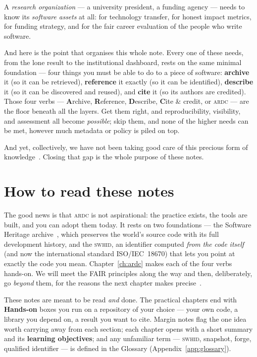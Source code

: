 A \emph{research organization} --- a university president, a funding agency --- needs to know its
\emph{software assets} at all: for technology transfer, for honest impact metrics, for funding
strategy, and for the fair career evaluation of the people who write software.

And here is the point that organises this whole note. Every one of these needs, from the lone result
to the institutional dashboard, rests on the same minimal foundation --- four things you must be
able to do to a piece of software: \textbf{archive} it (so it can be retrieved), \textbf{reference}
it exactly (so it can be identified), \textbf{describe} it (so it can be discovered and reused), and
\textbf{cite} it (so its authors are credited). Those four verbs --- \textbf{A}rchive,
\textbf{R}eference, \textbf{D}escribe, \textbf{C}ite \& credit, or \textsc{ardc} --- are the floor
beneath all the layers. Get them right, and reproducibility, visibility, and assessment all become
\emph{possible}; skip them, and none of the higher needs can be met, however much metadata or policy
is piled on top.


And yet, collectively, we have not been taking good care of this precious form of
knowledge~\autocite{SwhCACM2018}. Closing that gap is the whole purpose of these notes.

\section{How to read these notes}

The good news is that \textsc{ardc} is not aspirational: the practice exists, the tools are built,
and you can adopt them today. It rests on two foundations --- the Software Heritage archive~\autocite{softwareheritage}, which
preserves the world's source code with its full development history, and the \textsc{swhid}, an
identifier computed \emph{from the code itself} (and now the international standard ISO/IEC~18670)
that lets you point at exactly the code you mean. Chapter~\ref{ch:ardc} makes each of the four verbs
hands-on. We will meet the FAIR principles along the way and then, deliberately, go \emph{beyond}
them, for the reasons the next chapter makes precise~\autocite{NatureSD2026}.

These notes are meant to be read \emph{and} done. The practical chapters end with \textbf{Hands-on}
boxes you run on a repository of your choice --- your own code, a library you depend on, a result
you want to cite. Margin notes flag the one idea worth carrying away from each section; each chapter
opens with a short summary and its \textbf{learning objectives}; and any unfamiliar term --- \textsc{swhid}, snapshot,
forge, qualified identifier --- is defined in the Glossary (Appendix~\ref{app:glossary}).

